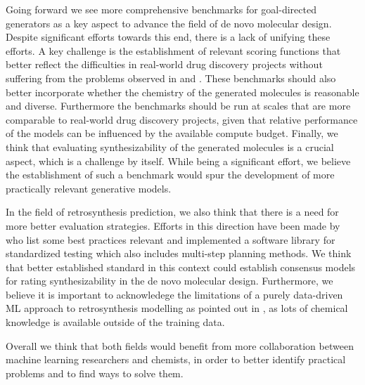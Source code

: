 Going forward we see more comprehensive benchmarks for goal-directed generators as a key aspect to
advance the field of de novo molecular design. Despite significant efforts
\citep{brownGuacaMolBenchmarkingModels2019,gaoSampleEfficiencyMatters2022,gaoSynthesizabilityMoleculesProposed2020,thomasMolScoreScoringEvaluation2024}
towards this end, there is a lack of unifying these efforts. A key challenge is the establishment of
relevant scoring functions that better reflect the difficulties in real-world drug discovery
projects \citep{fromerComputeraidedMultiobjectiveOptimization2023} without suffering from the
problems observed in  and \citep{lyuModelingExpansionVirtual2023}. These
benchmarks should also better incorporate whether the chemistry of the generated molecules is
reasonable \citep{thomasReevaluatingSampleEfficiency2022} and diverse. Furthermore the benchmarks
should be run at scales that are more comparable to real-world drug discovery projects, given that
relative performance of the models can be influenced by the available compute budget. Finally, we
think that evaluating synthesizability of the generated molecules is a crucial aspect, which is a
challenge by itself. While being a significant effort, we believe the establishment of such a
benchmark would spur the development of more practically relevant generative models.

In the field of retrosynthesis prediction, we also think that there is a need for more better
evaluation strategies. Efforts in this direction have been made by
\citet{maziarzReevaluatingRetrosynthesisAlgorithms2024a} who list some best practices relevant and
implemented a software library for standardized testing which also includes multi-step planning
methods. We think that better established standard in this context could establish consensus models
for rating synthesizability in the de novo molecular design. Furthermore, we believe it is important
to acknowledege the limitations of a purely data-driven ML approach to retrosynthesis modelling as
pointed out in \citep{strieth-kalthoffArtificialIntelligenceRetrosynthetic2024}, as lots of chemical
knowledge is available outside of the training data.

Overall we think that both fields would benefit from more collaboration between machine learning
researchers and chemists, in order to better identify practical problems
\citep{benderArtificialIntelligenceDrug2021} and to find ways to solve them.


